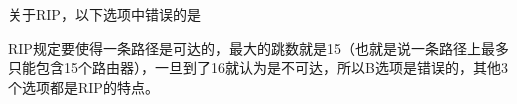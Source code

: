 \question 关于RIP，以下选项中错误的是
\par{}
\begin{solution}RIP规定要使得一条路径是可达的，最大的跳数就是15（也就是说一条路径上最多只能包含15个路由器），一旦到了16就认为是不可达，所以B选项是错误的，其他3个选项都是RIP的特点。
\end{solution}
